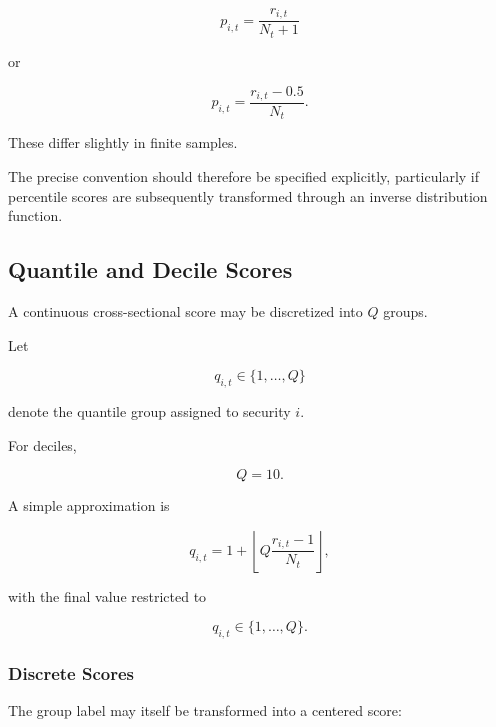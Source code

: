 \documentclass[11pt,a4paper]{article}
\begin{document}
\begin{equation}
p_{i,t}
=
\frac{r_{i,t}}{N_t+1}
\end{equation}

or

\begin{equation}
p_{i,t}
=
\frac{r_{i,t}-0.5}{N_t}.
\end{equation}

These differ slightly in finite samples.

The precise convention should therefore be specified explicitly, particularly
if percentile scores are subsequently transformed through an inverse
distribution function.


\subsection{Quantile and Decile Scores}
\label{subsec:quantile_decile_scores}

A continuous cross-sectional score may be discretized into $Q$ groups.

Let

\begin{equation}
q_{i,t}
\in
\{1,\ldots,Q\}
\end{equation}

denote the quantile group assigned to security $i$.

For deciles,

\begin{equation}
Q=10.
\end{equation}

A simple approximation is

\begin{equation}
\boxed{
q_{i,t}
=
1
+
\left\lfloor
Q
\frac{
r_{i,t}-1
}{
N_t
}
\right\rfloor,
}
\end{equation}

with the final value restricted to

\begin{equation}
q_{i,t}
\in
\{1,\ldots,Q\}.
\end{equation}


\subsubsection{Discrete Scores}

The group label may itself be transformed into a centered score:
\end{document}
